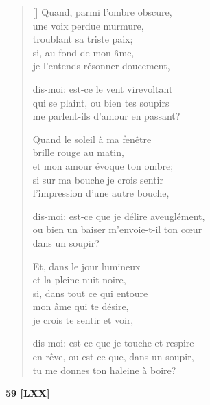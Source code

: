 \documentclass[a4paper,12pt]{book}
\begin{document}
\begin{verse}[\versewidth]
  Quand, parmi l'ombre obscure, \\
  une voix perdue murmure, \\
  troublant sa triste paix; \\
  si, au fond de mon âme, \\
  je l'entends résonner doucement,

  dis-moi: est-ce le vent virevoltant \\
  qui se plaint, ou bien tes soupirs \\
  me parlent-ils d'amour en passant?

  Quand le soleil à ma fenêtre \\
  brille rouge au matin, \\
  et mon amour évoque ton ombre; \\
  si sur ma bouche je crois sentir \\
  l'impression d'une autre bouche,

  dis-moi: est-ce que je délire aveuglément, \\
  ou bien un baiser m'envoie-t-il ton cœur \\
  dans un soupir?

  Et, dans le jour lumineux \\
  et la pleine nuit noire, \\
  si, dans tout ce qui entoure \\
  mon âme qui te désire, \\
  je crois te sentir et voir,

  dis-moi: est-ce que je touche et respire \\
  en rêve, ou est-ce que, dans un soupir, \\
  tu me donnes ton haleine à boire?
\end{verse}

\bigskip

\begin{center}
  \textbf{59 [LXX]}
\end{center}

\settowidth{\versewidth}{Bien que le vent sifflât dans les angles obscurs}
\end{document}
